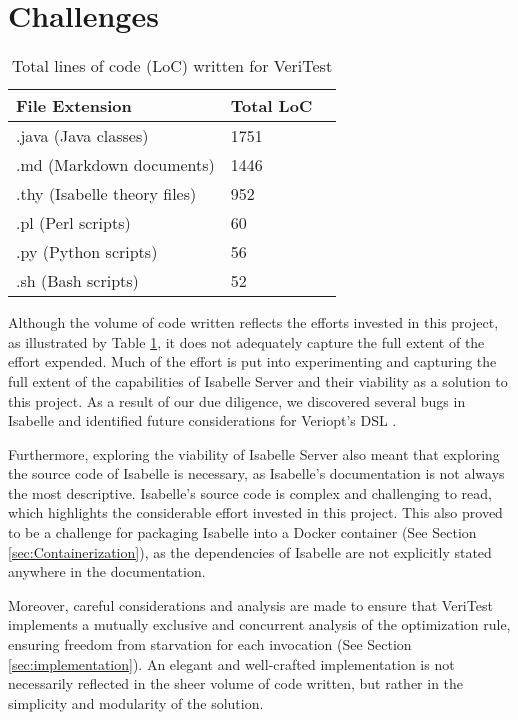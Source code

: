 \section{Challenges}

\begin{table}[!htb]
    \centering
    \begin{tabular}{lll}
      \toprule
      File Extension & Total LoC \\
      \midrule
      .java (Java classes) & 1751 \\
      .md (Markdown documents) & 1446 \\
      .thy (Isabelle theory files) & 952 \\
      .pl (Perl scripts) & 60 \\
      .py (Python scripts) & 56 \\
      .sh (Bash scripts) & 52 \\
      \bottomrule
    \end{tabular}
    \caption{Total lines of code (LoC) written for VeriTest}
    \label{tab:locTable}
\end{table}

Although the volume of code written reflects the efforts invested in this project, as illustrated by Table \ref{tab:locTable}, it does not 
adequately capture the full extent of the effort expended. Much of the effort is put into experimenting and capturing the full extent 
of the capabilities of Isabelle Server \cite{isabelleSystem} and their viability as a solution to this project. As a result of our due diligence, 
we discovered several bugs in Isabelle and identified future considerations for Veriopt's DSL \cite{Term_Graph_Optimizations}.

Furthermore, exploring the viability of Isabelle Server also meant that exploring the source code of Isabelle is necessary, as 
Isabelle's documentation is not always the most descriptive. Isabelle's source code is complex and challenging to 
read, which highlights the considerable effort invested in this project. This also proved to be a challenge for packaging 
Isabelle into a Docker container (See Section \ref{sec:Containerization}), as the dependencies of Isabelle are not explicitly stated 
anywhere in the documentation.

Moreover, careful considerations and analysis are made to ensure that VeriTest implements a mutually exclusive and concurrent analysis of 
the optimization rule, ensuring freedom from starvation for each invocation (See Section \ref{sec:implementation}). An elegant and 
well-crafted implementation is not necessarily reflected in the sheer volume of code written, but rather in the simplicity and modularity 
of the solution.
